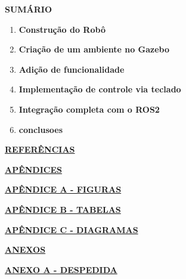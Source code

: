 
\noindent\textbf{SUMÁRIO}\label{section:sumario}


    \begin{enumerate}
        \item \textbf{Construção do Robô}
        \item \textbf{Criação de um ambiente no Gazebo}
        \item \textbf{Adição de funcionalidade}
        \item \textbf{Implementação de controle via teclado}
        \item \textbf{Integração completa com o ROS2}
        \item \textbf{conclusoes}
    \end{enumerate}

\hyperlink{referencias}{\textbf{REFERÊNCIAS}}

\vspace{0.3cm}
\hyperlink{apendices}{\textbf{APÊNDICES}}

\vspace{0.3cm}
\hyperlink{figuras}{\textbf{APÊNDICE A - FIGURAS}}

\vspace{0.3cm}
\hyperlink{tabelas}{\textbf{APÊNDICE B - TABELAS}}

\vspace{0.3cm}
\hyperlink{diagramas}{\textbf{APÊNDICE C - DIAGRAMAS}}

\vspace{0.3cm}
\hyperlink{anexos}{\textbf{ANEXOS}}

\vspace{0.3cm}

\hyperlink{despedida}{\textbf{ANEXO A - DESPEDIDA}}

\clearpage


